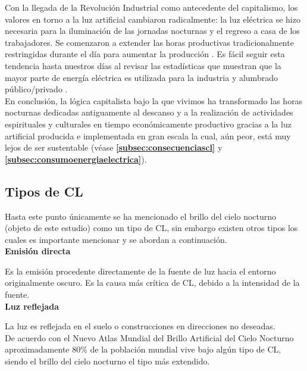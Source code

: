 Con la llegada de la Revolución Industrial como antecedente del capitalismo, los valores en torno a la luz artificial cambiaron radicalmente: la luz eléctrica se hizo necesaria para la iluminación de las jornadas nocturnas y el regreso a casa de los trabajadores. Se comenzaron a extender las horas productivas tradicionalmente restringidas durante el día para aumentar la producción \citep{Hudson1992}. Es fácil seguir esta tendencia hasta nuestros días al revisar las estadísticas que muestran que la mayor parte de energía eléctrica es utilizada para la industria y alumbrado público/privado \citep{Ramos2012}.\\ 


En conclusión, la lógica capitalista bajo la que vivimos ha transformado las horas nocturnas dedicadas antiguamente al descanso y a la realización de actividades espirituales y culturales en tiempo económicamente productivo gracias a la luz artificial producida e implementada en gran escala la cual, aún peor, está muy lejos de ser sustentable (véase \textbf{\autoref{subsec:consecuenciascl}} y \textbf{\autoref{subsec:consumoenergiaelectrica}}).

\newpage

\subsection{Tipos de CL} 

Hasta este punto únicamente se ha mencionado el brillo del cielo nocturno (objeto de este estudio) como un tipo de CL, sin embargo existen otros tipos \citep{LibroCL} los cuales es importante mencionar y se abordan a continuación.\\ 

\textbf{Emisión directa}

Es la emisión procedente directamente de la fuente de luz hacia el entorno originalmente oscuro. Es la causa más crítica de CL, debido a la intensidad de la fuente.\\ 

\textbf{Luz reflejada}

La luz es reflejada en el suelo o construcciones en direcciones no deseadas.\\ 


De acuerdo con el Nuevo Atlas Mundial del Brillo Artificial del Cielo Nocturno \citep{Falchi2016} aproximadamente 80$\%$ de la población mundial vive bajo algún tipo de CL, siendo el brillo del cielo nocturno el tipo más extendido.\\ 

